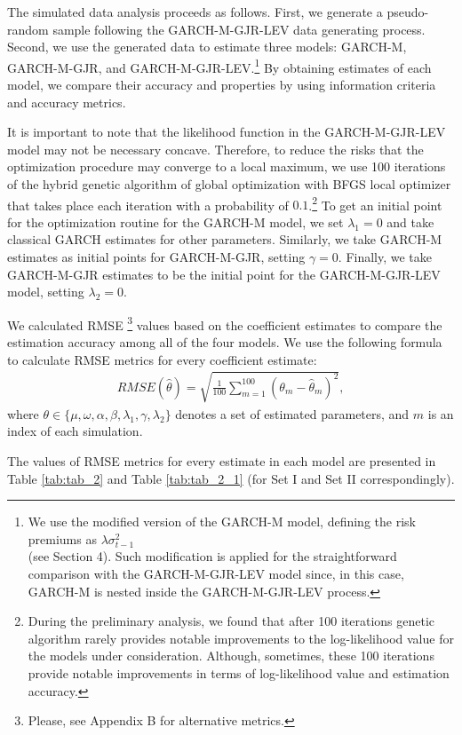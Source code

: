\documentclass[authoryear, 1p]{elsarticle}
\numberwithin{equation}{section}
\begin{document}
The simulated data analysis proceeds as follows. First, we generate a pseudo-random sample following the GARCH-M-GJR-LEV data generating process. Second, we use the generated data to estimate three models: GARCH-M, GARCH-M-GJR, and GARCH-M-GJR-LEV.\footnote{We use the modified version of the GARCH-M model, defining the risk premiums as $\lambda \sigma^2_{t-1}$ \\ (see Section 4). Such modification is applied for the straightforward comparison with the GARCH-M-GJR-LEV model since, in this case, GARCH-M is nested inside the GARCH-M-GJR-LEV process.} By obtaining estimates of each model, we compare their accuracy and properties by using information criteria and accuracy metrics. 

It is important to note that the likelihood function in the GARCH-M-GJR-LEV model may not be necessary concave. Therefore, to reduce the risks that the optimization procedure may converge to a local maximum, we use 100 iterations of the hybrid genetic algorithm of global optimization with BFGS local optimizer that takes place each iteration with a probability of $0.1$.\footnote{During the preliminary analysis, we found that after 100 iterations genetic algorithm rarely provides notable improvements to the log-likelihood value for the models under consideration. Although, sometimes, these 100 iterations provide notable improvements in terms of log-likelihood value and estimation accuracy.} To get an initial point for the optimization routine for the GARCH-M model, we set $\lambda_{1}=0$ and take classical GARCH estimates for other parameters. Similarly, we take GARCH-M estimates as initial points for GARCH-M-GJR, setting $\gamma=0$. Finally, we take GARCH-M-GJR estimates to be the initial point for the GARCH-M-GJR-LEV model, setting $\lambda_{2}=0$.

We calculated RMSE \footnote{Please, see Appendix B for alternative metrics.} values based on the coefficient estimates to compare the estimation accuracy among all of the four models. We use the following formula to calculate RMSE metrics for every coefficient estimate:
\begin{align}
RMSE(\hat{\theta}) = \sqrt{\frac{1}{100} \sum_{m = 1}^{100}\left(\theta_{m} - \hat{\theta}_{m}\right)^2},
\end{align}
where $\theta \in \{\mu, \omega, \alpha, \beta, \lambda_{1}, \gamma, \lambda_{2}\}$ denotes a set of estimated parameters, and $m$ is an index of each simulation.

The values of RMSE metrics for every estimate in each model are presented in Table \ref{tab:tab_2} and Table \ref{tab:tab_2_1} (for Set I and Set II correspondingly).
\end{document}
